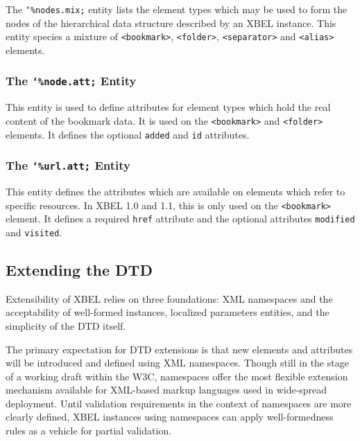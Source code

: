 \documentclass{howto}
\newcommand{\element}[1]{\texttt{<#1>}}
\newcommand{\attribute}[1]{\texttt{#1}}
\newcommand{\paramentity}[1]{\texttt{\char`\%#1;}}
\begin{document}
      The \paramentity{nodes.mix} entity lists the element types which
      may be used to form the nodes of the hierarchical data structure
      described by an XBEL instance.  This entity species a mixture of
      \element{bookmark}, \element{folder}, \element{separator} and
      \element{alias} elements.

    \subsubsection{The \paramentity{node.att} Entity
                   \label{entity-node.att}}

      This entity is used to define attributes for element types which 
      hold the real content of the bookmark data.  It is used on the
      \element{bookmark} and \element{folder} elements.  It defines
      the optional \attribute{added} and \attribute{id} attributes.

    \subsubsection{The \paramentity{url.att} Entity
                   \label{entity-url.att}}

      This entity defines the attributes which are available on
      elements which refer to specific resources.  In XBEL 1.0 and
      1.1, this is only used on the \element{bookmark} element.  It
      defines a required \attribute{href} attribute and the optional
      attributes \attribute{modified} and \attribute{visited}.

  \subsection{Extending the DTD
              \label{extending}}

    Extensibility of XBEL relies on three foundations: XML namespaces
    and the acceptability of well-formed instances, localized
    parameters entities, and the simplicity of the DTD itself.

    The primary expectation for DTD extensions is that new elements
    and attributes will be introduced and defined using XML
    namespaces.  Though still in the stage of a working draft within
    the W3C, namespaces offer the most flexible extension mechanism
    available for XML-based markup languages used in wide-spread
    deployment.  Until validation requirements in the context of
    namespaces are more clearly defined, XBEL instances using
    namespaces can apply well-formedness rules as a vehicle for
    partial validation.
\end{document}
